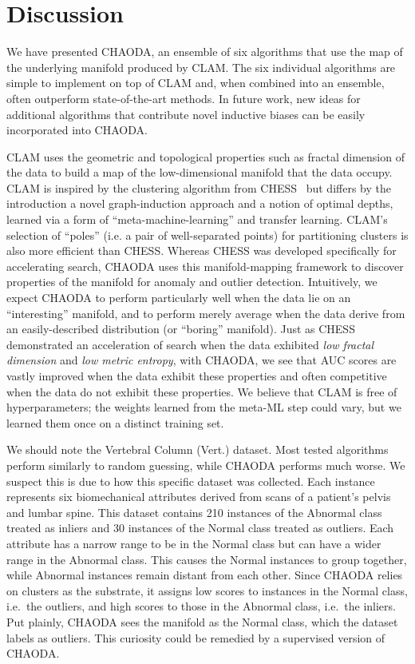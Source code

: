 \section{Discussion}
\label{sec:discussion}

We have presented CHAODA, an ensemble of six algorithms that use the map of the underlying manifold produced by CLAM\@.
The six individual algorithms are simple to implement on top of CLAM and, when combined into an ensemble, often outperform state-of-the-art methods.
In future work, new ideas for additional algorithms that contribute novel inductive biases can be easily incorporated into CHAODA.

CLAM uses the geometric and topological properties such as fractal dimension of the data to build a map of the low-dimensional manifold that the data occupy.
CLAM is inspired by the clustering algorithm from CHESS~\cite{ishaq2019clustered} but differs by the introduction a novel graph-induction approach and a notion of optimal depths, learned via a form of ``meta-machine-learning'' and transfer learning.
CLAM's selection of ``poles'' (i.e. a pair of well-separated points) for partitioning clusters is also more efficient than CHESS.
Whereas CHESS was developed specifically for accelerating search,
CHAODA uses this manifold-mapping framework to discover properties of the manifold for anomaly and outlier detection.
Intuitively, we expect CHAODA to perform particularly well when the data lie on an ``interesting'' manifold, and to perform merely average when the data derive from an easily-described distribution (or ``boring'' manifold).
Just as CHESS demonstrated an acceleration of search when the data exhibited \emph{low fractal dimension} and \emph{low metric entropy}, with CHAODA, we see that AUC scores are vastly improved when the data exhibit these properties and often competitive when the data do not exhibit these properties.
We believe that CLAM is free of hyperparameters; the weights learned from the meta-ML step could vary, but we learned them once on a distinct training set.

We should note the Vertebral Column (Vert.) dataset.
Most tested algorithms perform similarly to random guessing, while CHAODA performs much worse.
We suspect this is due to how this specific dataset was collected.
Each instance represents six biomechanical attributes derived from scans of a patient's pelvis and lumbar spine.
This dataset contains 210 instances of the Abnormal class treated as inliers and 30 instances of the Normal class treated as outliers.
Each attribute has a narrow range to be in the Normal class but can have a wider range in the Abnormal class.
This causes the Normal instances to group together, while Abnormal instances remain distant from each other.
Since CHAODA relies on clusters as the substrate, it assigns low scores to instances in the Normal class, i.e.\ the outliers, and high scores to those in the Abnormal class, i.e.\ the inliers.
Put plainly, CHAODA sees the manifold as the Normal class, which the dataset labels as outliers.
This curiosity could be remedied by a supervised version of CHAODA.

